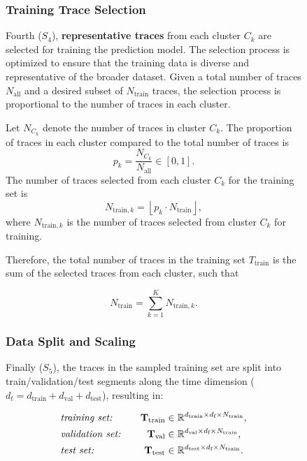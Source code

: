 \begin{figure}[!htbp]
{\subsubsection{Training Trace Selection}

Fourth ($S_4$), \textbf{representative traces} from each cluster $C_k$ are selected for training the prediction model. The selection process is optimized to ensure that the training data is diverse and representative of the broader dataset. Given a total number of traces $N_{\text{all}}$ and a desired subset of $N_{\text{train}}$ traces, the selection process is proportional to the number of traces in each cluster.

Let $N_{C_k}$ denote the number of traces in cluster $C_k$. The proportion of traces in each cluster compared to the total number of traces is
\begin{equation}
p_k = \frac{N_{C_k}}{N_{\text{all}}} \in \left[ 0, 1 \right].
\end{equation}
The number of traces selected from each cluster $C_k$ for the training set is
\begin{equation}
N_{\text{train},k} = \left\lfloor p_k \cdot N_{\text{train}} \right\rfloor,
\end{equation}
where $N_{\text{train},k}$ is the number of traces selected from cluster $C_k$ for training.

Therefore, the total number of traces in the training set $T_{\text{train}}$ is the sum of the selected traces from each cluster, such that

\begin{equation}  
N_{\text{train}} = \sum_{k=1}^{K} N_{\text{train},k}.
\end{equation}

\subsubsection{Data Split and Scaling}
\label{sec:ch4_data_split_scaling}

Finally ($S_5$), the traces in the sampled training set are split into train/validation/test segments along the time dimension ($d_t = d_{\text{train}} + d_{\text{val}} + d_{\text{test}}$), resulting in:

\begin{equation}
\begin{aligned}
&\text{\textit{training set:}} \quad  & \mathbf{T}_{\text{train}} &\in \mathbb{R}^{d_{\text{train}} \times d_{\text{f}} \times N_{\text{train}}}, \\
&\text{\textit{validation set:}} \quad & \mathbf{T}_{\text{val}} &\in \mathbb{R}^{d_{\text{val}} \times d_{\text{f}} \times N_{\text{train}}}, \\
&\text{\textit{test set:}} \quad & \mathbf{T}_{\text{test}} &\in \mathbb{R}^{d_{\text{test}} \times d_{\text{f}} \times N_{\text{train}}}.
\end{aligned} 
\end{equation}

}
\end{figure}
